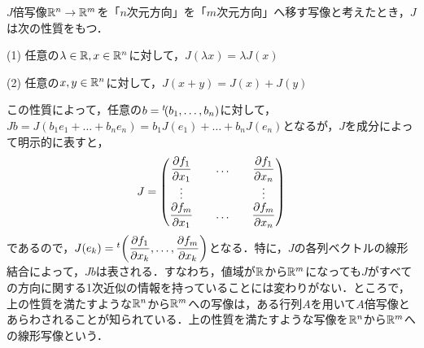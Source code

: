 $J$倍写像${\mathbb R}^n\rightarrow{\mathbb R}^m$を「$n$次元方向」を「$m$次元方向」へ移す写像と考えたとき，$J$は次の性質をもつ．
\begin{description}
\item{(1)} 任意の$\lambda\in{\mathbb R}, x\in{\mathbb R}^n$に対して，$J(\lambda x)=\lambda J(x)$
\item{(2)} 任意の$x,y\in{\mathbb R}^n$に対して，$J(x+y)=J(x)+J(y)$
\end{description}
この性質によって，任意の$b={}^t\!(b_1,\dots,b_n)$に対して，$Jb=J(b_1e_1+\dots+ b_ne_n)=b_1J(e_1)+\dots+b_nJ(e_n)$となるが，$J$を成分によって明示的に表すと，
$$
J=\begin{pmatrix} \displaystyle\frac{\partial f_1}{\partial x_1} && \dots && \displaystyle\frac{\partial f_1}{\partial x_n} \\ \vdots && && \vdots \\ \displaystyle\frac{\partial f_m}{\partial x_1} && \dots&&\displaystyle\frac{\partial f_m}{\partial x_n} \\ \end{pmatrix}
$$
であるので，$J(e_k)={}^t\!\left(\displaystyle\frac{\partial f_1}{\partial x_k},\dots,\displaystyle\frac{\partial f_m}{\partial x_k}\right)$となる．特に，$J$の各列ベクトルの線形結合によって，$Jb$は表される．すなわち，値域が${\mathbb R}$から${\mathbb R}^m$になっても$J$がすべての方向に関する1次近似の情報を持っていることには変わりがない．ところで，上の性質を満たすような${\mathbb R}^n$から${\mathbb R}^m$への写像は，ある行列$A$を用いて$A$倍写像とあらわされることが知られている．上の性質を満たすような写像を${\mathbb R}^n$から${\mathbb R}^m$への線形写像という．


